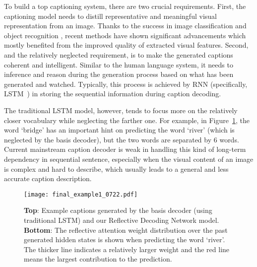 \documentclass[10pt,twocolumn,letterpaper]{article}
\begin{document}
To build a top captioning system, there are two crucial requirements.
First, the captioning model needs to distill representative and meaningful visual representation from an image. 
Thanks to the success in image classification \cite{krizhevsky2012imagenet} and object recognition \cite{he2014spatial,ren2015faster}, recent methods \cite{anderson2017bottom,lu2017knowing,xu2015showattendtell,yang2016review} have shown significant advancements which mostly benefited from the improved quality of extracted visual features.
Second, and the relatively neglected requirement, is to make the generated captions coherent and intelligent. 
Similar to the human language system, it needs to inference and reason during the generation process based on what has been generated and watched.
Typically, this process is achieved by RNN (specifically, LSTM~\cite{hochreiter1997long}) in storing the sequential information during caption decoding.

The traditional LSTM model, however, tends to focus more on the relatively closer vocabulary while neglecting the farther one.
For example, in Figure~\ref{fig:example}, the word `bridge' has an important hint on predicting the word `river' (which is neglected by the basis decoder), but the two words are separated by 6 words.
Current mainstream caption decoder is weak in handling this kind of long-term dependency in sequential sentence, especially when the visual content of an image is complex and hard to describe, which usually leads to a general and less accurate caption description.

\begin{figure}[t]
	\centering
\texttt{[image: final\_example1\_0722.pdf]}
	\caption{\textbf{Top}: Example captions generated by the basis decoder (using traditional LSTM) and our Reflective Decoding Network model. \textbf{Bottom}: The reflective attention weight distribution over the past generated hidden states is shown when predicting the word `river'. The thicker line indicates a relatively larger weight and the red line means the largest contribution to the prediction.}
\label{fig:example}
	\vspace{-0.2in}
\end{figure}
\end{document}
